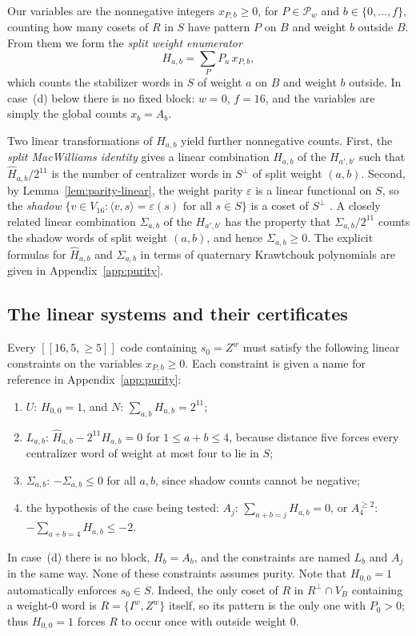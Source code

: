 \documentclass[11pt]{article}
\theoremstyle{definition}
\theoremstyle{remark}
\newcommand{\qc}[1]{[\![#1]\!]}
\begin{document}
Our variables are the nonnegative integers \(x_{P,b}\geq0\), for
\(P\in\mathcal P_w\) and \(b\in\{0,\ldots,f\}\), counting how many
cosets of \(R\) in \(S\) have pattern \(P\) on \(B\) and weight \(b\)
outside \(B\). From them we form the \emph{split weight enumerator}
\cite{macwilliams,laiashikhmin}
\[
 H_{a,b}=\sum_{P}P_a\,x_{P,b},
\]
which counts the stabilizer words in \(S\) of weight \(a\) on \(B\) and
weight \(b\) outside. In case~(d) below there is no fixed block:
\(w=0\), \(f=16\), and the variables are simply the global counts
\(x_b=A_b\).

Two linear transformations of \(H_{a,b}\) yield further nonnegative
counts. First, the \emph{split MacWilliams identity} gives a linear
combination \(\widehat H_{a,b}\) of the \(H_{a',b'}\) such that
\(\widehat H_{a,b}/2^{11}\) is the number of centralizer words in
\(S^\perp\) of split weight \((a,b)\). Second, by
Lemma~\ref{lem:parity-linear}, the weight parity \(\varepsilon\) is a
linear functional on \(S\), so the \emph{shadow}
\(\{v\in V_{16}:\langle v,s\rangle=\varepsilon(s)\text{ for all }s\in S\}\)
is a coset of \(S^\perp\) \cite{rains}. A closely related linear
combination \(\Sigma_{a,b}\) of the \(H_{a',b'}\) has the property that
\(\Sigma_{a,b}/2^{11}\) counts the shadow words of split weight
\((a,b)\), and hence \(\Sigma_{a,b}\geq0\). The explicit formulas for
\(\widehat H_{a,b}\) and \(\Sigma_{a,b}\) in terms of quaternary
Krawtchouk polynomials are given in Appendix~\ref{app:purity}.

\subsection{The linear systems and their certificates}

Every \(\qc{16,5,{\geq}5}\) code containing \(s_0=Z^w\) must satisfy the
following linear constraints on the variables \(x_{P,b}\geq0\). Each
constraint is given a name for reference in Appendix~\ref{app:purity}:
\begin{enumerate}[label=(\roman*)]
\item \(U\): \(H_{0,0}=1\), and \(N\): \(\sum_{a,b}H_{a,b}=2^{11}\);
\item \(L_{a,b}\): \(\widehat H_{a,b}-2^{11}H_{a,b}=0\) for \(1\leq a+b\leq4\),
 because distance five forces every centralizer word of weight at most
 four to lie in \(S\);
\item \(\Sigma_{a,b}\): \(-\Sigma_{a,b}\leq0\) for all \(a,b\), since
 shadow counts cannot be negative;
\item the hypothesis of the case being tested: \(A_j\):
 \(\sum_{a+b=j}H_{a,b}=0\), or \(A_4^{\geq2}\):
 \(-\sum_{a+b=4}H_{a,b}\leq-2\).
\end{enumerate}
In case~(d) there is no block, \(H_b=A_b\), and the constraints are
named \(L_b\) and \(A_j\) in the same way. None of these constraints
assumes purity. Note that \(H_{0,0}=1\) automatically enforces
\(s_0\in S\). Indeed, the only coset of \(R\) in \(R^\perp\cap V_B\)
containing a weight-\(0\) word is \(R=\{I^w,Z^w\}\) itself, so its
pattern is the only one with \(P_0>0\); thus \(H_{0,0}=1\) forces \(R\)
to occur once with outside weight \(0\).
\end{document}
